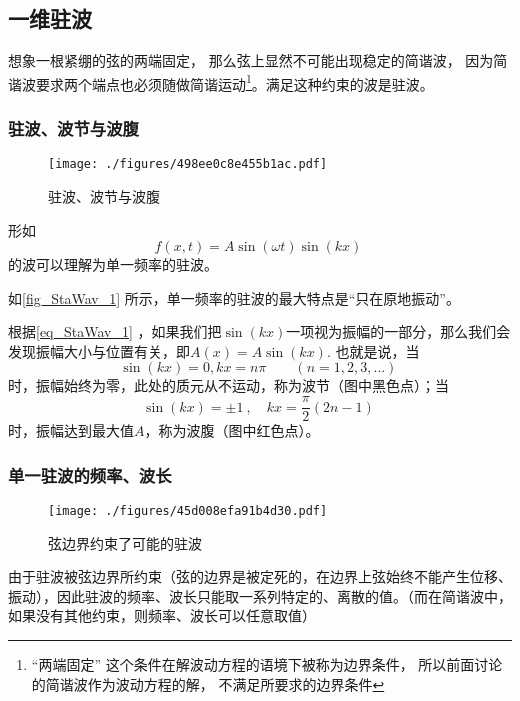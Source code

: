 
\begin{issues}
\issueDraft
\end{issues}


\subsection{一维驻波}
想象一根紧绷的弦的两端固定， 那么弦上显然不可能出现稳定的简谐波， 因为简谐波要求两个端点也必须随做简谐运动\footnote{“两端固定” 这个条件在解波动方程的语境下被称为边界条件， 所以前面讨论的简谐波作为波动方程的解， 不满足所要求的边界条件}。满足这种约束的波是驻波。

\subsubsection{驻波、波节与波腹}
\begin{figure}[ht]
\centering
\texttt{[image: ./figures/498ee0c8e455b1ac.pdf]}
\caption{驻波、波节与波腹} \label{fig_StaWav_1}
\end{figure}

形如
\begin{equation}\label{eq_StaWav_1}
f(x,t)=A\sin(\omega t)\sin(kx)~
\end{equation}
的波可以理解为单一频率的驻波。

如\autoref{fig_StaWav_1} 所示，单一频率的驻波的最大特点是“只在原地振动”。

根据\autoref{eq_StaWav_1} ，如果我们把$\sin(kx)$一项视为振幅的一部分，那么我们会发现振幅大小与位置有关，即$A(x) = A \sin(kx)$. 也就是说，当$$\sin(kx)=0, kx=n\pi \qquad (n=1,2,3,...)~$$时，振幅始终为零，此处的质元从不运动，称为波节（图中黑色点）；当$$\sin(kx)=\pm1~,\quad kx=\frac{\pi}{2} (2n-1)~$$时，振幅达到最大值$A$，称为波腹（图中红色点）。

\subsubsection{单一驻波的频率、波长}
\begin{figure}[ht]
\centering
\texttt{[image: ./figures/45d008efa91b4d30.pdf]}
\caption{弦边界约束了可能的驻波} \label{fig_StaWav_2}
\end{figure}

由于驻波被弦边界所约束（弦的边界是被定死的，在边界上弦始终不能产生位移、振动），因此驻波的频率、波长只能取一系列特定的、离散的值。（而在简谐波中，如果没有其他约束，则频率、波长可以任意取值）

